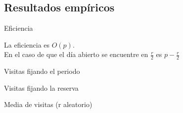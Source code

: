 \subsection{Resultados empíricos}
\begin{frame}{Eficiencia}
\begin{center}
\resizebox{3.5in}{!}{}
\end{center}

{\small{La eficiencia es $O(p)$.\\ En el caso de que el día abierto se encuentre en $\frac{r}{2}$ es $p-\frac{r}{2}$}}
\end{frame}

\begin{frame}{Visitas fijando el periodo}
\begin{center}
\resizebox{4in}{!}{}
\end{center}
\end{frame}

\begin{frame}{Visitas fijando la reserva}
\begin{center}
\resizebox{4in}{!}{}
\end{center}
\end{frame}

\begin{frame}{Media de visitas (r aleatorio)}
\begin{center}
\resizebox{4in}{!}{}
\end{center}
\end{frame}